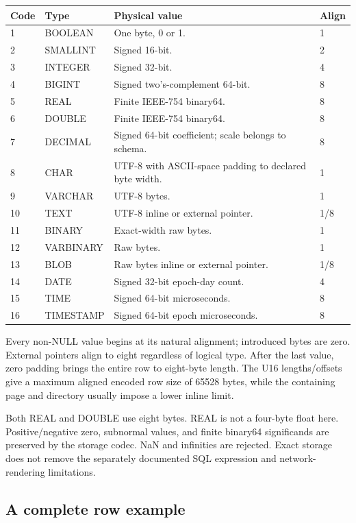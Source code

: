 \begin{longtable}{p{.08\linewidth}p{.18\linewidth}p{.48\linewidth}p{.12\linewidth}}
\toprule Code & Type & Physical value & Align \\\midrule
1 & BOOLEAN & One byte, 0 or 1. & 1 \\
2 & SMALLINT & Signed 16-bit. & 2 \\
3 & INTEGER & Signed 32-bit. & 4 \\
4 & BIGINT & Signed two's-complement 64-bit. & 8 \\
5 & REAL & Finite IEEE-754 binary64. & 8 \\
6 & DOUBLE & Finite IEEE-754 binary64. & 8 \\
7 & DECIMAL & Signed 64-bit coefficient; scale belongs to schema. & 8 \\
8 & CHAR & UTF-8 with ASCII-space padding to declared byte width. & 1 \\
9 & VARCHAR & UTF-8 bytes. & 1 \\
10 & TEXT & UTF-8 inline or external pointer. & 1/8 \\
11 & BINARY & Exact-width raw bytes. & 1 \\
12 & VARBINARY & Raw bytes. & 1 \\
13 & BLOB & Raw bytes inline or external pointer. & 1/8 \\
14 & DATE & Signed 32-bit epoch-day count. & 4 \\
15 & TIME & Signed 64-bit microseconds. & 8 \\
16 & TIMESTAMP & Signed 64-bit epoch microseconds. & 8 \\
\bottomrule
\end{longtable}

Every non-NULL value begins at its natural alignment; introduced bytes are zero. External pointers align to eight regardless of logical type. After the last value, zero padding brings the entire row to eight-byte length. The U16 lengths/offsets give a maximum aligned encoded row size of 65528 bytes, while the containing page and directory usually impose a lower inline limit.

Both REAL and DOUBLE use eight bytes. REAL is not a four-byte float here. Positive/negative zero, subnormal values, and finite binary64 significands are preserved by the storage codec. NaN and infinities are rejected. Exact storage does not remove the separately documented SQL expression and network-rendering limitations.

\subsection{A complete row example}

